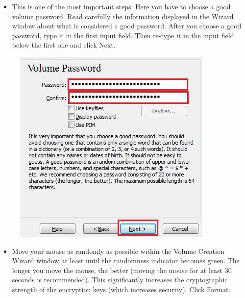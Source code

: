 \documentclass{tufte-handout}
\begin{document}
\begin{enumerate}
\begin{figure}
	\end{figure}
	\begin{itemize}
		\item  This is one of the most important steps. Here you have to choose a good volume password. Read carefully the information displayed in the Wizard window about what is considered a good password.
		After you choose a good password, type it in the first input field. Then re-type it in the input field below the first one and click Next.
	\end{itemize}
	\begin{figure}%
		\includegraphics[width=\linewidth]{img/vc_install_8.png}
	\end{figure}
	\begin{itemize}
		\item  Move your mouse as randomly as possible within the Volume Creation Wizard window at least until the randomness indicator becomes green. The longer you move the mouse, the better (moving the mouse for at least 30 seconds is recommended). This significantly increases the cryptographic strength of the encryption keys (which increases security).
		Click Format.
	\end{itemize}
	\begin{figure}%

\end{figure}
\end{enumerate}
\end{document}
